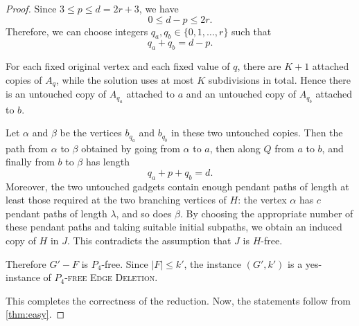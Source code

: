 \documentclass[10pt,a4paper]{amsart}
\begin{document}
\begin{proof}
Since $3\leq p\leq d=2r+3$, we have
\[
    0\leq d-p\leq 2r.
\]
Therefore, we can choose integers $q_a,q_b\in\{0,1,\ldots,r\}$ such that
\[
    q_a+q_b=d-p.
\]

For each fixed original vertex and each fixed value of $q$, there are $K+1$
attached copies of $A_q$, while the solution uses at most $K$ subdivisions in
total.  Hence there is an untouched copy of $A_{q_a}$ attached to $a$ and an
untouched copy of $A_{q_b}$ attached to $b$.

Let $\alpha$ and $\beta$ be the vertices $b_{q_a}$ and $b_{q_b}$ in these two
untouched copies.  Then the path from $\alpha$ to $\beta$ obtained by going
from $\alpha$ to $a$, then along $Q$ from $a$ to $b$, and finally from $b$ to
$\beta$ has length
\[
    q_a+p+q_b=d.
\]
Moreover, the two untouched gadgets contain enough pendant paths of length at
least those required at the two branching vertices of $H$: the vertex
$\alpha$ has $c$ pendant paths of length $\lambda$, and so does $\beta$.
By choosing the appropriate number of these pendant paths and taking suitable
initial subpaths, we obtain an induced copy of $H$ in $J$.  This contradicts
the assumption that $J$ is $H$-free.

Therefore $G'-F$ is $P_4$-free.  Since $|F|\leq k'$, the instance $(G',k')$ is
a yes-instance of \textsc{$P_4$-free Edge Deletion}.

This completes the correctness of the reduction. Now, the statements follow from \cref{thm:easy}.
\end{proof}
\end{document}
